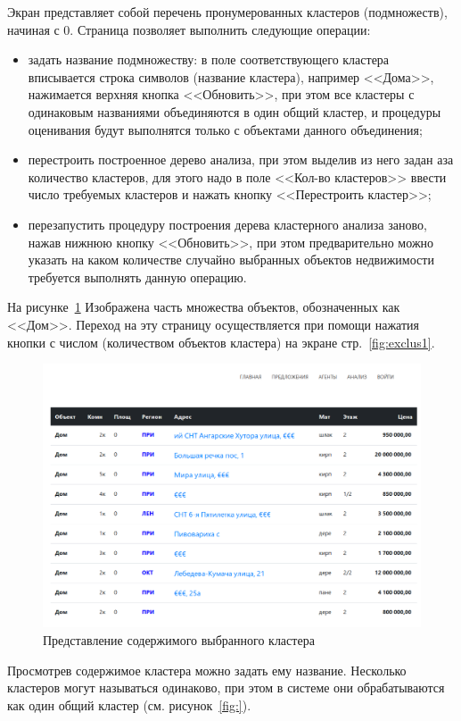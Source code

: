 \documentclass[a4paper,14pt,openany,final]{extreport} %
\begin{document}
{Экран представляет собой перечень пронумерованных кластеров (подмножеств), начиная с 0.  Страница позволяет выполнить следующие операции:
\begin{itemize}
\item задать название подмножеству: в поле соответствующего кластера вписывается строка символов (название кластера), например <<Дома>>, нажимается верхняя кнопка <<Обновить>>, при этом все кластеры с одинаковым названиями объединяются в один общий кластер, и процедуры оценивания будут выполнятся только с объектами данного объединения;
\item перестроить построенное дерево анализа, при этом выделив из него задан аза количество кластеров, для этого надо в поле <<Кол-во кластеров>> ввести число требуемых кластеров и нажать кнопку <<Перестроить кластер>>;
\item перезапустить процедуру построения дерева кластерного анализа заново, нажав нижнюю кнопку <<Обновить>>, при этом предварительно можно указать на каком количестве случайно выбранных объектов недвижимости требуется выполнять данную операцию.
\end{itemize}

На рисунке~\ref{fig:cluscontent} Изображена часть множества объектов, обозначенных как <<Дом>>. Переход на эту страницу осуществляется при помощи нажатия кнопки с числом (количеством объектов кластера) на экране стр.~\ref{fig:exclus1}.

\begin{figure}[htbp]
  \centering
  \includegraphics[width=0.8\linewidth]{screen-cluster-content.png}
  \caption{Представление содержимого выбранного кластера}
  \label{fig:cluscontent}
\end{figure}

Просмотрев содержимое кластера можно задать ему название. Несколько кластеров могут называться одинаково, при этом в системе они обрабатываются как один общий кластер (см. рисунок~\ref{fig:}).

}
\end{document}
